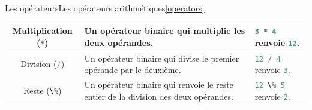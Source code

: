 \documentclass{beamer}
\begin{document}
\begin{frame}{Les opérateurs}{Les opérateurs arithmétiques\cref{operators}}
\begin{tiny}
\begin{table}[h!]
\begin{tabular}{|c|p{4cm}|p{4cm}|}
                Multiplication (\lstinline[language=Javascript]!*!) & Un opérateur binaire qui multiplie les deux opérandes.                                                                                                                                                                                                                                 & \lstinline[language=Javascript]!3 * 4! renvoie \lstinline[language=Javascript]!12!.                                                                                                                                                                                                                           \\
                \hline
                Division (\lstinline[language=Javascript]!/!)       & Un opérateur binaire qui divise le premier opérande par le deuxième.                                                                                                                                                                                                                   & \lstinline[language=Javascript]!12 / 4! renvoie \lstinline[language=Javascript]!3!.                                                                                                                                                                                                                           \\
                \hline
                Reste (\lstinline[language=Javascript]!\%!)         & Un opérateur binaire qui renvoie le reste entier de la division des deux opérandes.                                                                                                                                                                                                    & \lstinline[language=Javascript]!12 \% 5! renvoie \lstinline[language=Javascript]!2!.                                                                                                                                                                                                                          \\
                \hline
            \end{tabular}
        \end{table}
    \end{tiny}
\end{frame}
\end{document}
